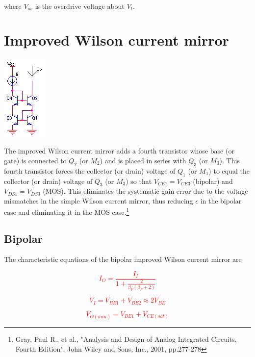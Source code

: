 where $V_{ov}$ is the overdrive voltage about $V_{t}$.

\section{Improved Wilson current mirror}
\begin{center}
	\includegraphics{schematics/wilsoncurrentmirrorimproved.PNG}
\end{center}
The improved Wilson current mirror adds a fourth transistor whose base (or gate) is connected to $Q_{2}$ (or $M_{2}$) and is placed in series with $Q_{3}$ (or $M_{3}$). This fourth transistor forces the collector (or drain) voltage of $Q_{1}$ (or $M_{1}$) to equal the collector (or drain) voltage of $Q_{3}$ (or $M_{3}$) so that $V_{CE1} = V_{CE3}$ (bipolar) and $V_{DS1} = V_{DS3}$ (MOS). This eliminates the systematic gain error due to the voltage mismatches in the simple Wilson current mirror, thus reducing $\epsilon$ in the bipolar case and eliminating it in the MOS case.\footnote{Gray, Paul R., et al., "Analysis and Design of Analog Integrated Circuits, Fourth Edition", John Wiley and Sons, Inc., 2001, pp.277-278}

\subsection{Bipolar}
The characteristic equations of the bipolar improved Wilson current mirror are

\textcolor{red}{
\begin{equation}I_{O} = \frac{I_{I}}{1+\frac{2}{\beta_{F} (\beta_{F} + 2)}}
\end{equation}
}

\textcolor{red}{
\begin{equation}
V_{I}= V_{BE1} + V_{BE2} \approx 2V_{BE}
\end{equation}
}

\textcolor{red}{
\begin{equation}
V_{O(min)} = V_{BE1} + V_{CE(sat)}
\end{equation}
}

